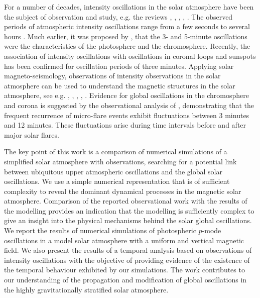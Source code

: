 \documentclass[physics,article,submit,pdftex,moreauthors]{Definitions/mdpi}
\begin{document}
 For a number of decades, intensity oscillations in the solar atmosphere have been the subject of observation and study, e.g. the reviews \cite{Banerjee2011}, \cite{deMoortel2009}, \cite{Mathioudakis2013}, \cite{Ruderman2009}, \cite{Wang2011}. The observed periods of atmospheric intensity oscillations range from  a few seconds to several hours \cite{Auchere2014}. Much earlier, it was proposed by \cite{Jensen1963}, that the 3- and 5-minute oscillations were the characteristics of the photosphere and the chromosphere. Recently, the association of intensity oscillations with oscillations in coronal loops and sunspots has been confirmed for oscillation periods of three minutes. Applying solar magneto-seismology, observations of intensity observations in the solar atmosphere can be used to understand the magnetic structures in the solar atmosphere, see e.g. \cite{Roberts1984}, \cite{Banerjee2007}, \cite{Zaqarashvili2007}, \cite{Erdelyi2008}, \cite{Verth2010}.  Evidence for global oscillations  in the chromosphere and corona is suggested by the observational analysis of \cite{Gyenge2018},  demonstrating that the frequent recurrence of micro-flare events exhibit fluctuations between 3 minutes and 12 minutes. These fluctuations arise during time intervals before and after major solar flares.


The key point of this work is a comparison of numerical simulations  of a simplified solar atmosphere with observations, searching for a  potential link between ubiquitous upper atmospheric oscillations and the global solar oscillations. We use a  simple numerical representation that is of sufficient complexity to reveal the dominant dynamical processes in the magnetic solar atmosphere. Comparison of the reported observational work with the results of the modelling provides an indication that the modelling is sufficiently complex to give an insight into the physical mechanisms behind the solar global oscillations. We report the results of numerical simulations of photospheric $p$-mode oscillations in a model solar atmosphere with a uniform and vertical magnetic field. We also present the results of a temporal analysis based on observations of intensity oscillations with the objective of providing evidence of the existence of the temporal behaviour exhibited by our simulations. The work contributes to our understanding of the propagation and modification of global oscillations in the highly gravitationally stratified solar atmosphere. 




\end{document}
